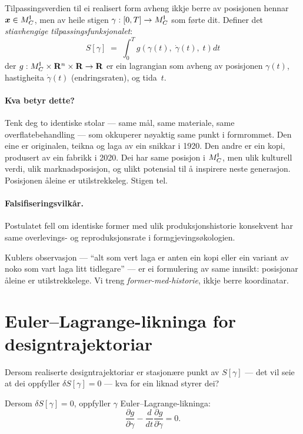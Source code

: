 \begin{postmark}\label{post:L.8.1}
Tilpassingsverdien til ei realisert form avheng ikkje berre av
posisjonen hennar $\bm{x} \in M^{\mathsf{I}}_C$, men av heile stigen
$\gamma : [0, T] \to M^{\mathsf{I}}_C$ som førte dit. Definer det
\emph{stiavhengige tilpassingsfunksjonalet}:
\[
  S[\gamma] \;=\; \int_0^T
    g\!\left(\gamma(t),\; \dot{\gamma}(t),\; t\right) dt
\]
der $g : M^{\mathsf{I}}_C \times \mathbf{R}^n \times \mathbf{R} \to \mathbf{R}$ er ein lagrangian som
avheng av posisjonen $\gamma(t)$, hastigheita
$\dot{\gamma}(t)$ (endringsraten), og tida~$t$.
\end{postmark}

\paragraph{Kva betyr dette?}
Tenk deg to identiske stolar --- same mål, same materiale, same
overflatebehandling --- som okkuperer nøyaktig same punkt i
formrommet. Den eine er originalen, teikna og laga av ein
snikkar i 1920. Den andre er ein kopi, produsert av ein fabrikk
i 2020. Dei har same posisjon i $M^{\mathsf{I}}_C$, men ulik kulturell verdi,
ulik marknadsposisjon, og ulikt potensial til å inspirere neste
generasjon. Posisjonen åleine er utilstrekkeleg. Stigen tel.

\paragraph{Falsifiseringsvilkår.}
Postulatet fell om identiske former med ulik produksjonshistorie
konsekvent har same overlevings- og reproduksjonsrate i
formgjevingsøkologien.

\medskip
Kublers observasjon --- ``alt som vert laga er anten ein kopi eller
ein variant av noko som vart laga litt tidlegare'' --- er ei
formulering av same innsikt: posisjonar åleine er utilstrekkelege.
Vi treng \emph{former-med-historie}, ikkje berre koordinatar.


\section{Euler--Lagrange-likninga for designtrajektoriar}

Dersom realiserte designtrajektoriar er stasjonære punkt av
$S[\gamma]$ --- det vil seie at dei oppfyller $\delta S[\gamma] = 0$
--- kva for ein liknad styrer dei?

\begin{satmark}\label{thm:L.8.2}
Dersom $\delta S[\gamma] = 0$, oppfyller $\gamma$ Euler--Lagrange-likninga:
\[
  \frac{\partial g}{\partial \gamma}
  - \frac{d}{dt}\frac{\partial g}{\partial \dot{\gamma}} = 0.
\]
\end{satmark}

